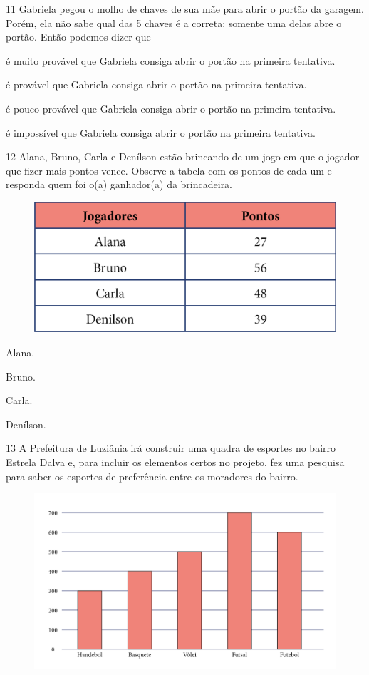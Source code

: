 \num{11} Gabriela pegou o molho de chaves de sua mãe para abrir o portão da
garagem. Porém, ela não sabe qual das 5 chaves é a correta; somente uma
delas abre o portão. Então podemos dizer que

\begin{escolha}
\item é muito provável que Gabriela consiga abrir o portão na primeira tentativa.

\item é provável que Gabriela consiga abrir o portão na primeira tentativa.

\item é pouco provável que Gabriela consiga abrir o portão na primeira tentativa.

\item é impossível que Gabriela consiga abrir o portão na primeira tentativa.
\end{escolha}


\pagebreak
\num{12} Alana, Bruno, Carla e Denílson estão brincando de um jogo em que o
jogador que fizer mais pontos vence. Observe a tabela com os pontos de
cada um e responda quem foi o(a) ganhador(a) da brincadeira.

\begin{figure}[htpb!]
\centering
\includegraphics[width=.5\textwidth]{./media/image121.png}
\end{figure}

\begin{escolha}
\item Alana.

\item Bruno.

\item Carla.

\item Denílson.
\end{escolha}

\num{13} A Prefeitura de Luziânia irá construir uma quadra de esportes no bairro
Estrela Dalva e, para incluir os elementos certos no projeto, fez uma
pesquisa para saber os esportes de preferência entre os moradores
do bairro.

\begin{figure}[htpb!]
\centering
\includegraphics[width=.8\textwidth]{./media/image122.png}
\end{figure}

